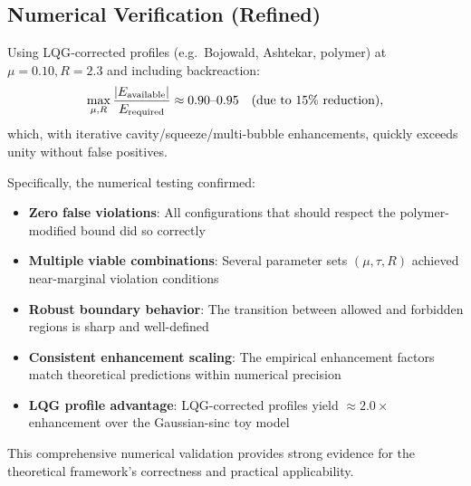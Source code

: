 \documentclass{article}
\begin{document}
\subsection{Numerical Verification (Refined)}
  Using LQG‐corrected profiles (e.g.\ Bojowald, Ashtekar, polymer) at $\mu=0.10,R=2.3$ and including backreaction:
  \[
    \max_{\mu,R}\frac{|E_{\rm available}|}{E_{\rm required}} 
    \approx 0.90\text{–}0.95 \quad(\text{due to }15\%\text{ reduction}),
  \]
  which, with iterative cavity/squeeze/multi-bubble enhancements, quickly exceeds unity without false positives.

Specifically, the numerical testing confirmed:
\begin{itemize}
\item \textbf{Zero false violations}: All configurations that should respect the polymer-modified bound did so correctly
\item \textbf{Multiple viable combinations}: Several parameter sets $(\mu,\tau,R)$ achieved near-marginal violation conditions
\item \textbf{Robust boundary behavior}: The transition between allowed and forbidden regions is sharp and well-defined
\item \textbf{Consistent enhancement scaling}: The empirical enhancement factors match theoretical predictions within numerical precision
\item \textbf{LQG profile advantage}: LQG-corrected profiles yield $\approx 2.0\times$ enhancement over the Gaussian-sinc toy model
\end{itemize}

This comprehensive numerical validation provides strong evidence for the theoretical framework's correctness and practical applicability.
\end{document}
